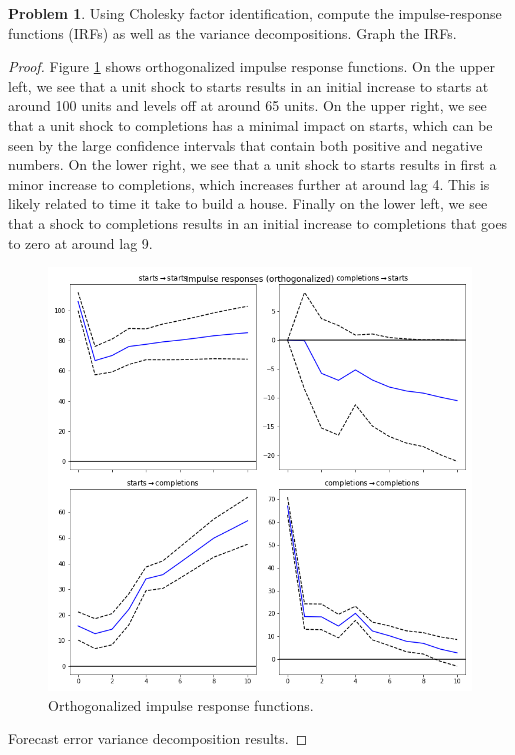 \documentclass[oneside,reqno]{amsart}
\theoremstyle{definition}
\newtheorem{prob}{Problem}
\begin{document}
\begin{prob}
Using Cholesky factor identification, compute the impulse-response functions (IRFs) as well as the variance decompositions. Graph the IRFs.
\end{prob}

\begin{proof}
Figure \ref{irf} shows orthogonalized impulse response functions. On the upper left, we see that a unit shock to starts results in an initial increase to starts at around 100 units and levels off at around 65 units. On the upper right, we see that a unit shock to completions has a minimal impact on starts, which can be seen by the large confidence intervals that contain both positive and negative numbers. On the lower right, we see that a unit shock to starts results in first a minor increase to completions, which increases further at around lag 4. This is likely related to time it take to build a house. Finally on the lower left, we see that a shock to completions results in an initial increase to completions that goes to zero at around lag 9. 
\begin{figure}
\includegraphics[width=\textwidth]{irf}
\caption{Orthogonalized impulse response functions.}
\label{irf}
\end{figure}
\begin{table}
\caption{Forecast error variance decomposition results.}

\end{table}
\end{proof}
\end{document}
